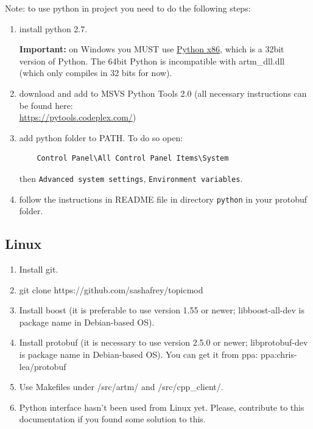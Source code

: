 \documentclass[11pt,a4paper,twoside]{report}
\begin{document}
Note: to use python in project you need to do the following steps:
\begin{enumerate}
	\item install python 2.7.

    {\bf Important:} on Windows you MUST use
    \href{https://www.python.org/ftp/python/2.7.6/python-2.7.6.msi}{Python x86},
    which is a 32bit version of Python. The 64bit Python is incompatible with artm\_dll.dll
    (which only compiles in 32 bits for now).
	\item download and add to MSVS Python Tools 2.0 (all necessary instructions can be found here: \\
	\url{https://pytools.codeplex.com/}) \\
	\item add python folder to PATH. To do so open:
\begin{verbatim}
    Control Panel\All Control Panel Items\System
\end{verbatim}
	then \verb'Advanced system settings', \verb'Environment variables'.
	\item follow the instructions in README file in directory \verb'python' in your protobuf folder.
\end{enumerate}

\subsection{Linux}

\begin{enumerate}
    \item Install git.
    \item git clone https://github.com/sashafrey/topicmod
    \item Install boost (it is preferable to use version 1.55 or newer; \hbox{libboost-all-dev} is package name in Debian-based OS).
    \item Install protobuf (it is necessary to use version 2.5.0 or newer; \hbox{libprotobuf-dev} is package name in Debian-based OS). You can get it from ppa: \hbox{ppa:chris-lea/protobuf}
    \item Use Makefiles under /src/artm/ and /src/cpp\_client/.
    \item Python interface hasn't been used from Linux yet. Please, contribute to this documentation if you
    found some solution to this.
\end{enumerate}
\end{document}
